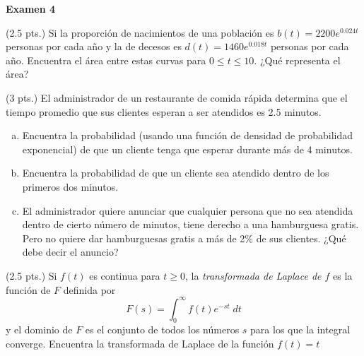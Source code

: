 \documentclass[12pt]{exam}
\begin{document}
\centering


\Large 
\textbf{Examen 4}\\


\normalsize

\pointformat{\bfseries\boldmath(\thepoints)}
\vskip12pt

    
    \begin{questions}

     \question (2.5 pts.)
       Si la proporción de nacimientos de una población es $b(t)=2200e^{0.024t}$ personas por cada año y la de decesos es $d(t)=1460e^{0.018t}$ personas por cada año. Encuentra el área entre estas curvas para $0\leq t\leq 10$. ¿Qué representa el área?
    
\vskip10pt
\question (3 pts.)
El administrador de un restaurante de comida rápida determina que el tiempo promedio que sus clientes esperan a ser atendidos es 2.5 minutos.
\begin{enumerate}[a)]
\item Encuentra la probabilidad (usando una función de densidad de probabilidad exponencial) de que un cliente tenga que esperar durante más de 4 minutos.
\item Encuentra la probabilidad de que un cliente sea atendido
dentro de los primeros dos minutos.
\item El administrador quiere anunciar que cualquier persona que no sea atendida dentro de cierto número de minutos, tiene derecho a una hamburguesa gratis. Pero no quiere dar hamburguesas gratis a más de 2\% de sus clientes. ¿Qué debe decir el anuncio?
\end{enumerate}
\vskip10pt
    

    \question  (2.5 pts.) Si $f(t)$ es continua para $t\geq 0$, la \textit{transformada de Laplace de $f$} es la función de $F$ definida por $$F(s)=\displaystyle\int_0^\infty f(t)e^{-st}\;dt$$
    y el dominio de $F$ es el conjunto de todos los números $s$ para los que la integral converge. Encuentra la transformada de Laplace de la  función $f(t)=t$


\end{questions}
\end{document}
